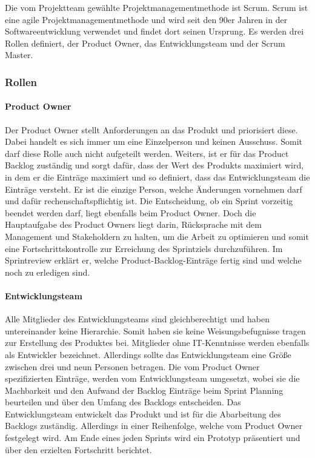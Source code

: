 Die vom Projektteam gewählte Projektmanagementmethode ist Scrum. Scrum ist eine agile Projektmanagementmethode und wird seit den 90er Jahren in der Softwareentwicklung verwendet und findet dort seinen Ursprung. Es werden drei Rollen definiert, der Product Owner, das Entwicklungsteam und der Scrum Master. 

\subsubsection{Rollen}   
\paragraph{Product Owner}

Der Product Owner stellt Anforderungen an das Produkt und priorisiert diese. Dabei handelt es sich immer um eine Einzelperson und keinen Ausschuss. Somit darf diese Rolle auch nicht aufgeteilt werden. Weiters, ist er für das Product Backlog zuständig und sorgt dafür, dass der Wert des Produkts maximiert wird, in dem er die Einträge maximiert und so definiert, dass das Entwicklungsteam die Einträge versteht. Er ist die einzige Person, welche Änderungen vornehmen darf und dafür rechenschaftspflichtig ist. Die Entscheidung, ob ein Sprint vorzeitig beendet werden darf, liegt ebenfalls beim Product Owner. Doch die Hauptaufgabe des Product Owners liegt darin, Rücksprache mit dem Management und Stakeholdern zu halten, um die Arbeit zu optimieren und somit eine Fortschrittskontrolle zur Erreichung des Sprintziels durchzuführen. Im Sprintreview erklärt er, welche Product-Backlog-Einträge fertig sind und welche noch zu erledigen sind. 

\paragraph{Entwicklungsteam} 
Alle Mitglieder des Entwicklungsteams sind gleichberechtigt und haben untereinander keine Hierarchie. Somit haben sie keine Weisungsbefugnisse tragen zur Erstellung des Produktes bei. Mitglieder ohne IT-Kenntnisse werden ebenfalls als Entwickler bezeichnet. Allerdings sollte das Entwicklungsteam eine Größe zwischen drei und neun Personen betragen. Die vom Product Owner spezifizierten Einträge, werden vom Entwicklungsteam umgesetzt, wobei sie die Machbarkeit und den Aufwand der Backlog Einträge beim Sprint Planning beurteilen und über den Umfang des Backlogs entscheiden. Das Entwicklungsteam entwickelt das Produkt und ist für die Abarbeitung des Backlogs zuständig. Allerdings in einer Reihenfolge, welche vom Product Owner festgelegt wird. Am Ende eines jeden Sprints wird ein Prototyp präsentiert und über den erzielten Fortschritt berichtet. 

